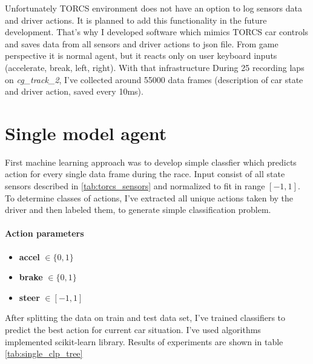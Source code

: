 \documentclass[declaration,shortabstract,english,inz]{iithesis}
\begin{document}
Unfortunately TORCS environment does not have an option to log sensors data and driver actions.
It is planned to add this functionality in the future development.
That's why I developed software which mimics TORCS car controls and saves data from all sensors and driver actions to json file.
From game perspective it is normal agent, but it reacts only on user keyboard inputs (accelerate, break, left, right).
 With that infrastructure During 25 recording laps on \textit{cg\_track\_2}, I've collected around 55000 data frames (description of car state and driver action, saved every 10ms).

\section{Single model agent}



First machine learning approach was to develop simple classfier which predicts action for every single data frame during the race.
Input consist of all state sensors described  in \ref{tab:torcs_sensors} and normalized to fit in range $[-1,1]$.
To determine classes of actions, I've extracted all unique actions taken by the driver and then labeled them, to generate simple classification problem.
\paragraph{Action parameters}
\begin{itemize}
    \item \textbf{accel} $\in \{0,1\}$
    \item \textbf{brake} $\in \{0,1\}$ 
    \item \textbf{steer} $\in [-1,1]$
\end{itemize}
After splitting the data on train and test data set, I've trained classifiers to predict the best action for current car situation.
I've used algorithms implemented scikit-learn \cite{scikit_learn} library.
Results of experiments are shown in table \ref{tab:single_clp_tree}
\end{document}
